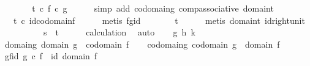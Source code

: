 \begin{isabellebody}
\ \ \isamarkupfalse%
\ \isamarkupfalse%
\ {\isachardoublequoteopen}{\isachardot}{\kern0pt}{\isachardot}{\kern0pt}{\isachardot}{\kern0pt}\ {\isacharequal}{\kern0pt}\ t\ {\isasymcirc}\isactrlsub c\ {\isacharparenleft}{\kern0pt}f\ {\isasymcirc}\isactrlsub c\ g{\isacharparenright}{\kern0pt}{\isachardoublequoteclose}\isanewline
\ \ \ \ \isamarkupfalse%
\ {\isacharparenleft}{\kern0pt}simp\ add{\isacharcolon}{\kern0pt}\ codomain{\isacharunderscore}{\kern0pt}g\ comp{\isacharunderscore}{\kern0pt}associative\ domain{\isacharunderscore}{\kern0pt}t{\isacharparenright}{\kern0pt}\isanewline
\ \ \isamarkupfalse%
\ \isamarkupfalse%
\ {\isachardoublequoteopen}{\isachardot}{\kern0pt}{\isachardot}{\kern0pt}{\isachardot}{\kern0pt}\ {\isacharequal}{\kern0pt}\ t\ {\isasymcirc}\isactrlsub c\ id{\isacharparenleft}{\kern0pt}codomain{\isacharparenleft}{\kern0pt}f{\isacharparenright}{\kern0pt}{\isacharparenright}{\kern0pt}{\isachardoublequoteclose}\isanewline
\ \ \ \ \isamarkupfalse%
\ {\isacharparenleft}{\kern0pt}metis\ fg{\isacharunderscore}{\kern0pt}id{\isacharparenright}{\kern0pt}\isanewline
\ \ \isamarkupfalse%
\ \isamarkupfalse%
\ {\isachardoublequoteopen}{\isachardot}{\kern0pt}{\isachardot}{\kern0pt}{\isachardot}{\kern0pt}\ {\isacharequal}{\kern0pt}\ t{\isachardoublequoteclose}\isanewline
\ \ \ \ \isamarkupfalse%
\ {\isacharparenleft}{\kern0pt}metis\ domain{\isacharunderscore}{\kern0pt}t\ id{\isacharunderscore}{\kern0pt}right{\isacharunderscore}{\kern0pt}unit{\isacharparenright}{\kern0pt}\isanewline
\ \ \ \ \isanewline
\ \ \isamarkupfalse%
\ \isamarkupfalse%
\ {\isachardoublequoteopen}s\ {\isacharequal}{\kern0pt}\ t{\isachardoublequoteclose}\isanewline
\ \ \ \ \isamarkupfalse%
\ calculation\ \isamarkupfalse%
\ auto\isanewline
{}\isamarkupfalse%
\isanewline
\ \ \isamarkupfalse%
\ g\ h\ k\isanewline
\ \ \isamarkupfalse%
\ domain{\isacharunderscore}{\kern0pt}g{\isacharcolon}{\kern0pt}\ {\isachardoublequoteopen}domain\ g\ {\isacharequal}{\kern0pt}\ codomain\ f{\isachardoublequoteclose}\isanewline
\ \ \isamarkupfalse%
\ codomain{\isacharunderscore}{\kern0pt}g{\isacharcolon}{\kern0pt}\ {\isachardoublequoteopen}codomain\ g\ {\isacharequal}{\kern0pt}\ domain\ f{\isachardoublequoteclose}\isanewline
\ \ \isamarkupfalse%
\ gf{\isacharunderscore}{\kern0pt}id{\isacharcolon}{\kern0pt}\ {\isachardoublequoteopen}g\ {\isasymcirc}\isactrlsub c\ f\ {\isacharequal}{\kern0pt}\ id\ {\isacharparenleft}{\kern0pt}domain\ f{\isacharparenright}{\kern0pt}{\isachardoublequoteclose}\isanewline

\end{isabellebody}
